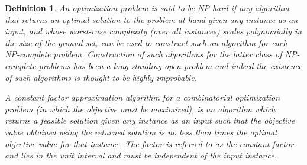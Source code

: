 \documentclass[11pt] {article}
\newtheorem{definition}{Definition}
\begin{document}
\begin{definition}
An optimization problem is said to be {\em NP-hard} if   any algorithm that returns an optimal solution to the problem at hand given any instance as an input, and whose worst-case complexity (over all instances) scales polynomially in the size of the ground set, can be used to construct such an algorithm for each NP-complete problem. Construction of such algorithms for the latter class of NP-complete problems has been a long standing open problem \cite{Karp_NP72} and indeed the existence of such algorithms is thought to be highly improbable.




A {\em constant factor  approximation algorithm} for a combinatorial optimization problem (in which the objective must be maximized), is an algorithm which returns a feasible solution   given any instance as an input such that the objective value obtained using the returned solution is no less than  times the optimal objective value for that instance. The factor  is referred to as the constant-factor and lies in the unit interval   and must be independent of the input instance. \end{definition}
\end{document}
